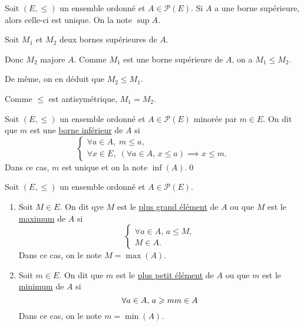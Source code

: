 \begin{prop}
	Soit $(E, \le)$ un ensemble ordonné et $A \in \mathcal{P}(E)$. Si $A$ a une borne supérieure, alors celle-ci est unique. On la note $\sup A$.
\end{prop}

\begin{prv}
	Soit $M_1$ et $M_2$ deux bornes supérieures de $A$.

	Donc $M_2$ majore $A$. Comme $M_1$ est une borne supérieure de $A$, on a $M_1\le M_2$.

	De même, on en déduit que $M_2 \le M_1$.

	Comme $\le$ est antisymétrique, $M_1 = M_2$.
\end{prv}

\begin{prop-defn}
	Soit $(E, \le)$ un ensemble ordonné et $A \in \mathcal{P}(E)$ minorée par $m \in E$. On dit que $m$ est une \underline{borne inférieur}  de $A$ si \[
		\begin{cases}
			\forall a \in A,\;m\le a,\\
			\forall x \in E,\;(\forall a \in A,\,x\le a) \implies x \le m.
		\end{cases}
	\] Dans ce cas, $m$ est unique et on la note $\inf(A)$.\qed
\end{prop-defn}

\begin{defn}
	Soit $(E, \le)$ un ensemble ordonné et $A \in \mathcal{P}(E)$.

	\begin{enumerate}
		\item Soit $M \in E$. On dit qye $M$ est le \underline{plus grand élément}  de $A$ ou que $M$ est le \underline{maximum}  de $A$ si \[
				\begin{cases}
					\forall a \in A,\,a \le M,\\
					M \in A.
				\end{cases}
			\] Dans ce cas, on le note $M = \max(A)$.
		\item Soit $m \in E$. On dit que $m$ est le \underline{plus petit élément}  de $A$ ou que $m$ est le \underline{minimum}  de $A$ si \[
				\forall a \in A,\, a \ge m\\
				m \in A
			\] Dans ce cas, on le note $m = \min(A)$.
	\end{enumerate}
\end{defn}

